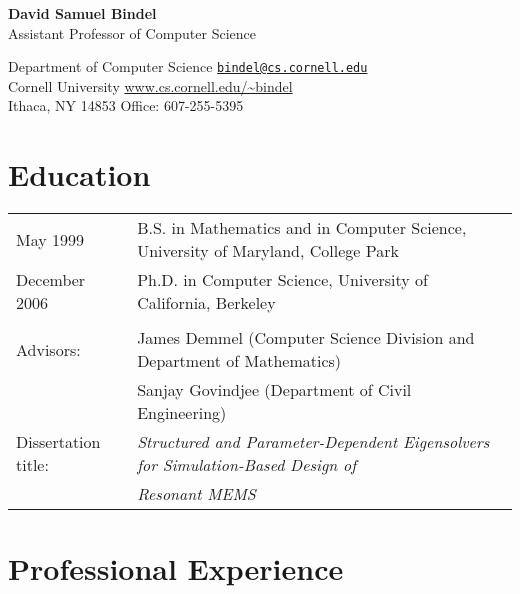 \documentclass{article}
\begin{document}
\begin{center}
  {\Large \bf David Samuel Bindel} \\
  Assistant Professor of Computer Science
\end{center}

\begin{trivlist}
\item
Department of Computer Science
  \hfill \href{mail:bindel@cs.cornell.edu}{\tt bindel@cs.cornell.edu} \\
Cornell University
  \hfill \url{www.cs.cornell.edu/~bindel} \\
Ithaca, NY 14853
  \hfill Office: 607-255-5395
\end{trivlist}


\section*{Education}

\begin{tabular}{ll}
May 1999 &
  B.S. in Mathematics and in Computer Science,
  University of Maryland, College Park \\
December 2006 &
  Ph.D. in Computer Science, University of California, Berkeley
\\
\\
Advisors:
 & James Demmel (Computer Science Division and Department of Mathematics) \\
 & Sanjay Govindjee (Department of Civil Engineering) \\
Dissertation title: &
   {\em Structured and Parameter-Dependent Eigensolvers for
        Simulation-Based Design of} \\
&  {\em Resonant MEMS}
\end{tabular}


\section*{Professional Experience}
\end{document}
